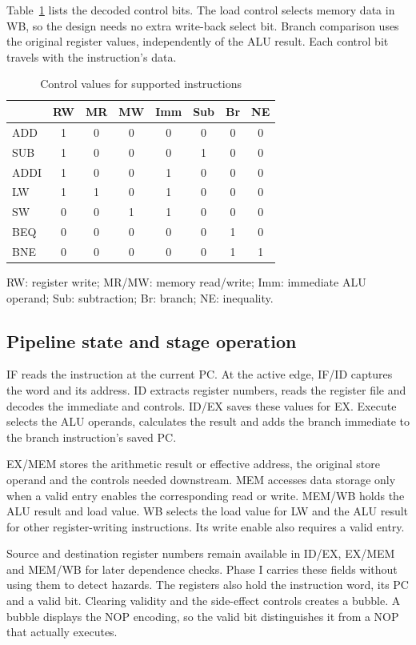 \documentclass[conference]{IEEEtran}
\begin{document}
Table~\ref{tab:ctrl} lists the decoded control bits. The load control selects memory data in WB, so the design needs no extra write-back select bit. Branch comparison uses the original register values, independently of the ALU result. Each control bit travels with the instruction's data.

\begin{table}[t]
\caption{Control values for supported instructions}
\label{tab:ctrl}\centering\small
\begin{tabular}{lccccccc}\hline
 & RW & MR & MW & Imm & Sub & Br & NE\\\hline
ADD  &1&0&0&0&0&0&0\\
SUB  &1&0&0&0&1&0&0\\
ADDI &1&0&0&1&0&0&0\\
LW   &1&1&0&1&0&0&0\\
SW   &0&0&1&1&0&0&0\\
BEQ  &0&0&0&0&0&1&0\\
BNE  &0&0&0&0&0&1&1\\\hline
\end{tabular}
\par\smallskip\footnotesize RW: register write; MR/MW: memory read/write; Imm: immediate ALU operand; Sub: subtraction; Br: branch; NE: inequality.
\end{table}

\subsection{Pipeline state and stage operation}
IF reads the instruction at the current PC. At the active edge, IF/ID captures the word and its address. ID extracts register numbers, reads the register file and decodes the immediate and controls. ID/EX saves these values for EX. Execute selects the ALU operands, calculates the result and adds the branch immediate to the branch instruction's saved PC.

EX/MEM stores the arithmetic result or effective address, the original store operand and the controls needed downstream. MEM accesses data storage only when a valid entry enables the corresponding read or write. MEM/WB holds the ALU result and load value. WB selects the load value for LW and the ALU result for other register-writing instructions. Its write enable also requires a valid entry.

Source and destination register numbers remain available in ID/EX, EX/MEM and MEM/WB for later dependence checks. Phase I carries these fields without using them to detect hazards. The registers also hold the instruction word, its PC and a valid bit. Clearing validity and the side-effect controls creates a bubble. A bubble displays the NOP encoding, so the valid bit distinguishes it from a NOP that actually executes.
\end{document}
